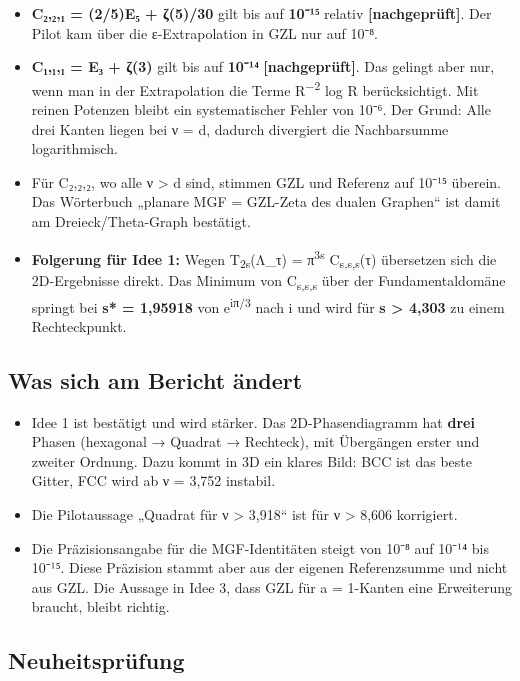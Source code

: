 \begin{itemize}
\tightlist
\item
  \textbf{C₂,₂,₁ = (2/5)E₅ + ζ(5)/30} gilt bis auf \textbf{10⁻¹⁵} relativ \textbf{{[}nachgeprüft{]}}. Der Pilot kam über die ε-Extrapolation in GZL nur auf 10⁻⁸.
\item
  \textbf{C₁,₁,₁ = E₃ + ζ(3)} gilt bis auf \textbf{10⁻¹⁴} \textbf{{[}nachgeprüft{]}}. Das gelingt aber nur, wenn man in der Extrapolation die Terme R\textsuperscript{−2} log R berücksichtigt. Mit reinen Potenzen bleibt ein systematischer Fehler von 10⁻⁶. Der Grund: Alle drei Kanten liegen bei ν = d, dadurch divergiert die Nachbarsumme logarithmisch.
\item
  Für C₂,₂,₂, wo alle ν \textgreater{} d sind, stimmen GZL und Referenz auf 10⁻¹⁵ überein. Das Wörterbuch „planare MGF = GZL-Zeta des dualen Graphen`` ist damit am Dreieck/Theta-Graph bestätigt.
\item
  \textbf{Folgerung für Idee 1:} Wegen T\textsubscript{2s}(Λ\_τ) = π\textsuperscript{3s} C\textsubscript{s,s,s}(τ) übersetzen sich die 2D-Ergebnisse direkt. Das Minimum von C\textsubscript{s,s,s} über der Fundamentaldomäne springt bei \textbf{s* = 1,95918} von e\textsuperscript{iπ/3} nach i und wird für \textbf{s \textgreater{} 4,303} zu einem Rechteckpunkt.
\end{itemize}

\subsection{Was sich am Bericht ändert}

\begin{itemize}
\tightlist
\item
  Idee 1 ist bestätigt und wird stärker. Das 2D-Phasendiagramm hat \textbf{drei} Phasen (hexagonal → Quadrat → Rechteck), mit Übergängen erster und zweiter Ordnung. Dazu kommt in 3D ein klares Bild: BCC ist das beste Gitter, FCC wird ab ν = 3,752 instabil.
\item
  Die Pilotaussage „Quadrat für ν \textgreater{} 3,918`` ist für ν \textgreater{} 8,606 korrigiert.
\item
  Die Präzisionsangabe für die MGF-Identitäten steigt von 10⁻⁸ auf 10⁻¹⁴ bis 10⁻¹⁵. Diese Präzision stammt aber aus der eigenen Referenzsumme und nicht aus GZL. Die Aussage in Idee 3, dass GZL für a = 1-Kanten eine Erweiterung braucht, bleibt richtig.
\end{itemize}

\subsection{Neuheitsprüfung}

